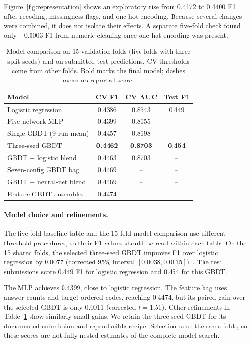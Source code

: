 \documentclass[10pt,conference,compsocconf]{IEEEtran}
\begin{document}
Figure~\ref{fig:representation} shows an exploratory rise from 0.4172
to 0.4400 F1 after recoding, missingness flags, and one-hot encoding.
Because several changes were combined, it does not isolate their
effects. A separate five-fold check found only $-0.0003$ F1 from
numeric cleaning once one-hot encoding was present.

\begin{table}[t]
 \caption{Model comparison on 15 validation folds (five folds with
 three split seeds) and on submitted test predictions. CV thresholds
 come from other folds. Bold marks the final model; dashes mean no
 reported score.}
 \label{tab:advanced}
 \centering
 \footnotesize
 \setlength{\tabcolsep}{2pt}
 \begin{tabular}{@{}lccc@{}}
 \toprule
 Model & CV F1 & CV AUC & Test F1\\
 \midrule
 Logistic regression & 0.4386 & 0.8643 & 0.449\\
 Five-network MLP & 0.4399 & 0.8655 & --\\
 Single GBDT (9-run mean) & 0.4457 & 0.8698 & --\\
 Three-seed GBDT & \textbf{0.4462} & \textbf{0.8703} & \textbf{0.454}\\
 GBDT + logistic blend & 0.4463 & 0.8703 & --\\
 Seven-config GBDT bag & 0.4469 & -- & --\\
 GBDT + neural-net blend & 0.4469 & -- & --\\
 Feature GBDT ensembles & 0.4474 & -- & --\\
 \bottomrule
 \end{tabular}
\end{table}

\paragraph{Model choice and refinements.}
The five-fold baseline table and the 15-fold model comparison use
different threshold procedures, so their F1 values should be read
within each table. On the 15 shared folds, the selected three-seed GBDT
improves F1 over logistic regression by 0.0077 (corrected 95\% interval
$[0.0038,0.0115]$)~\cite{nadeau2003inference}. The test submissions
score 0.449 F1 for logistic regression and 0.454 for this GBDT.

The MLP achieves 0.4399, close to logistic regression. The feature bag
uses answer counts and target-ordered codes, reaching 0.4474, but its
paired gain over the selected GBDT is only 0.0011 (corrected $t=1.51$).
Other refinements in Table~\ref{tab:advanced} show similarly small gains.
We retain the three-seed GBDT for its documented submission and
reproducible recipe. Selection used the same folds, so these scores
are not fully nested estimates of the complete model search.
\end{document}
